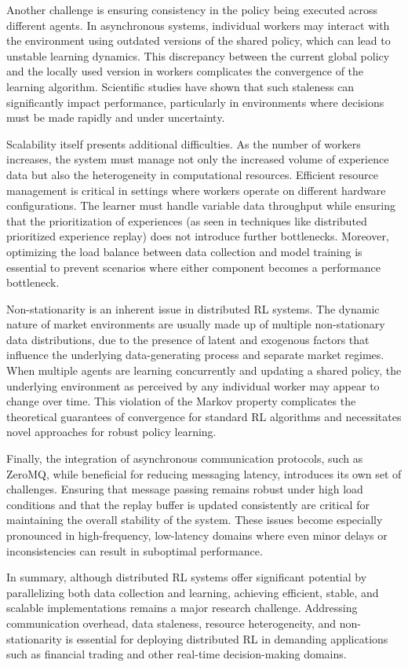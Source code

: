 Another challenge is ensuring consistency in the policy being executed across different agents.
In asynchronous systems, individual workers may interact with the environment using outdated versions of the shared policy,
which can lead to unstable learning dynamics.
This discrepancy between the current global policy and the locally used version in workers complicates the convergence of the learning algorithm.
Scientific studies have shown that such staleness can significantly impact performance,
particularly in environments where decisions must be made rapidly and under uncertainty.


Scalability itself presents additional difficulties.
As the number of workers increases, the system must manage not only the increased volume of experience data but
also the heterogeneity in computational resources.
Efficient resource management is critical in settings where workers operate on different hardware configurations.
The learner must handle variable data throughput while ensuring that the prioritization of experiences
(as seen in techniques like distributed prioritized experience replay) does not introduce further bottlenecks.
Moreover, optimizing the load balance between data collection and model training is essential to
prevent scenarios where either component becomes a performance bottleneck.

Non-stationarity is an inherent issue in distributed RL systems.
The dynamic nature of market environments are usually made up of multiple non-stationary data distributions,
due to the presence of latent and exogenous factors that influence the underlying data-generating process and separate market regimes.
When multiple agents are learning concurrently and updating a shared policy, the underlying environment as perceived by
any individual worker may appear to change over time.
This violation of the Markov property complicates the theoretical guarantees of convergence for standard RL algorithms and
necessitates novel approaches for robust policy learning.

Finally, the integration of asynchronous communication protocols, such as ZeroMQ, while beneficial for reducing messaging latency,
introduces its own set of challenges.
Ensuring that message passing remains robust under high load conditions and that the replay buffer is updated consistently are
critical for maintaining the overall stability of the system.
These issues become especially pronounced in high-frequency,
low-latency domains where even minor delays or inconsistencies can result in suboptimal performance.

In summary, although distributed RL systems offer significant potential by parallelizing both data collection and learning,
achieving efficient, stable, and scalable implementations remains a major research challenge.
Addressing communication overhead, data staleness, resource heterogeneity,
and non-stationarity is essential for deploying distributed RL in demanding applications such as financial trading and other real-time decision-making domains.
